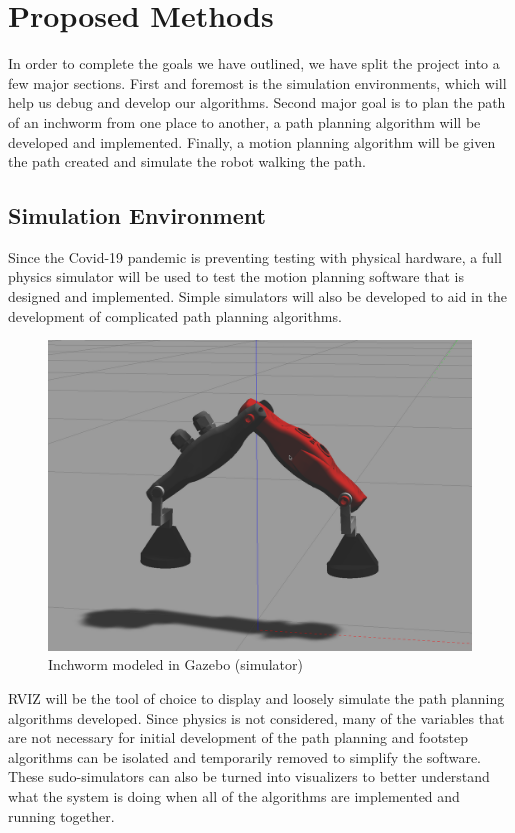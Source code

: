 \section{Proposed Methods}
In order to complete the goals we have outlined, we have split the project into a few major sections. First and foremost is the simulation environments, which will help us debug and develop our algorithms. Second major goal is to plan the path of an inchworm from one place to another, a path planning algorithm will be developed and implemented. Finally,  a motion planning algorithm will be given the path created and simulate the robot walking the path.

\subsection{Simulation Environment}
Since the Covid-19 pandemic is preventing testing with physical hardware, a full physics simulator will be used to test the motion planning software that is designed and implemented. Simple simulators will also be developed to aid in the development of complicated path planning algorithms.

\begin{figure}[ht]
    \includegraphics[width=\linewidth]{figures/GazeboSim.png}
    \caption{Inchworm modeled in Gazebo (simulator) \cite{PastMQP}}
    \label{fig:InchwormSim}
\end{figure} 

RVIZ will be the tool of choice to display and loosely simulate the path planning algorithms developed. Since physics is not considered, many of the variables that are not necessary for initial development of the path planning and footstep algorithms can be isolated and temporarily removed to simplify the software. These sudo-simulators can also be turned into visualizers to better understand what the system is doing when all of the algorithms are implemented and running together.

